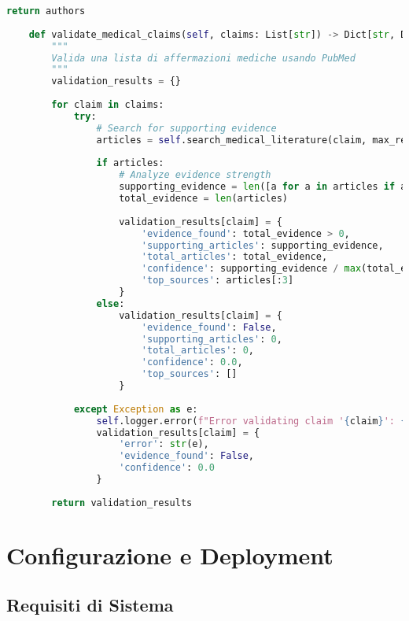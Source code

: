 \documentclass[12pt,a4paper]{report}
\begin{document}
\begin{lstlisting}[language=Python, caption=PubMed Service Implementation]
        return authors
    
    def validate_medical_claims(self, claims: List[str]) -> Dict[str, Dict]:
        """
        Valida una lista di affermazioni mediche usando PubMed
        """
        validation_results = {}
        
        for claim in claims:
            try:
                # Search for supporting evidence
                articles = self.search_medical_literature(claim, max_results=5)
                
                if articles:
                    # Analyze evidence strength
                    supporting_evidence = len([a for a in articles if a['relevance_score'] > 0.7])
                    total_evidence = len(articles)
                    
                    validation_results[claim] = {
                        'evidence_found': total_evidence > 0,
                        'supporting_articles': supporting_evidence,
                        'total_articles': total_evidence,
                        'confidence': supporting_evidence / max(total_evidence, 1),
                        'top_sources': articles[:3]
                    }
                else:
                    validation_results[claim] = {
                        'evidence_found': False,
                        'supporting_articles': 0,
                        'total_articles': 0,
                        'confidence': 0.0,
                        'top_sources': []
                    }
                    
            except Exception as e:
                self.logger.error(f"Error validating claim '{claim}': {e}")
                validation_results[claim] = {
                    'error': str(e),
                    'evidence_found': False,
                    'confidence': 0.0
                }
        
        return validation_results
\end{lstlisting}

\chapter{Configurazione e Deployment}

\section{Requisiti di Sistema}
\end{document}
